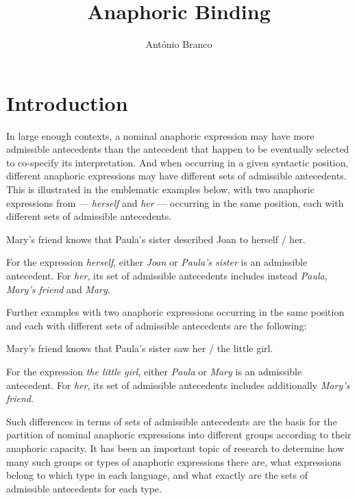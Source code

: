 \documentclass[output=paper
	        ,collection
	        ,collectionchapter
 	        ,biblatex
                ,babelshorthands
                ,newtxmath
                ,draftmode
                ,colorlinks, citecolor=brown
]{langscibook}
\title{Anaphoric Binding}
\author{%
António Branco\affiliation{University of Lisbon}
}
\begin{document}
\maketitle
\label{chap-binding}

\section{Introduction} 


In large enough contexts, a nominal anaphoric expression may have more
admissible antecedents than the antecedent that happen
to be eventually selected to co-specify its interpretation. 
And when occurring in a given syntactic position, different anaphoric expressions may 
have different sets of admissible antecedents. This is illustrated in the emblematic examples 
below, with two anaphoric expressions from  --- \textit{herself} and \textit{her} --- 
occurring in the same position, each with different sets of admissible antecedents.

\begin{exe}
\ex Mary's friend knows that Paula's sister described Joan to herself / her.
\end{exe}

For the expression \textit{herself}, either \textit{Joan} or \textit{Paula's sister} is an admissible antecedent. 
For \textit{her}, its set of admissible antecedents includes instead \textit{Paula}, \textit{Mary's friend} and \textit{Mary}.

Further examples with two anaphoric expressions occurring in the same position
and each with different sets of admissible antecedents are the following:

\begin{exe}
\ex Mary's friend knows that Paula's sister saw her / the little girl.
\end{exe}

For the expression \textit{the little girl}, either \textit{Paula} or \textit{Mary} is an admissible antecedent. 
For \textit{her}, its set of admissible antecedents includes additionally \textit{Mary's friend}.

Such differences in terms of sets of admissible antecedents are the basis for 
the partition of nominal anaphoric expressions into different groups according to their anaphoric
capacity. It has been an important topic of research to determine
how many such  groups or types of anaphoric expressions there are, what expressions belong
to which type in each language, and what exactly are the sets of admissible antecedents for each type.
\end{document}
